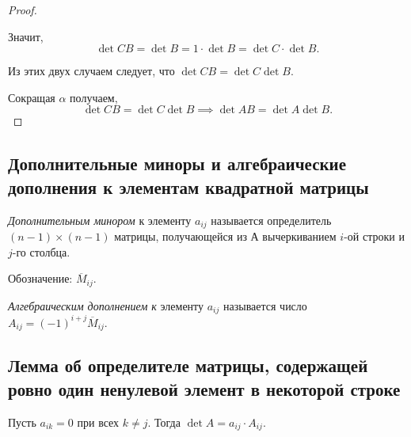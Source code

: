 \begin{proof}
\begin{description}
        Значит,
        \begin{equation*}
            \det CB = \det B = 1 \cdot \det B = \det C \cdot \det B
        .\end{equation*}
    \end{description}

    Из этих двух случаем следует, что $\det CB = \det C \det B$.

    Сокращая $\alpha$ получаем,
    \begin{equation*}
        \det CB = \det C \det B \implies \det AB = \det A \det B
    .\end{equation*}
\end{proof}

\begin{comment}
    Пусть $A \in M_n$, $A_{\text{ул}}$ -- её улучшенный ступенчатый вид.
    \begin{equation*}
        \det A \neq 0 \iff A_{\text{ул}} = E
    .\end{equation*}
\end{comment}


\subsection{Дополнительные миноры и алгебраические дополнения к элементам квадратной матрицы}
\begin{definition}
    \textit{Дополнительным минором} к элементу $a_{ij}$ называется определитель $(n-1) \times (n-1)$ матрицы, получающейся из $А$ вычеркиванием $i$-ой строки и $j$-го столбца.

    Обозначение: $\overline{M}_{ij}$.
\end{definition}

\begin{definition}
    \textit{Алгебраическим дополнением к} элементу $a_{ij}$ называется число $A_{ij} = (-1)^{i+j} \overline{M}_{ij}$.
\end{definition}


\subsection{Лемма об определителе матрицы, содержащей ровно один ненулевой элемент в некоторой строке}
\begin{lemma}
    Пусть $a_{ik} = 0$ при всех $k \neq j$. Тогда $\det A = a_{ij} \cdot A_{ij}$.
\end{lemma}


